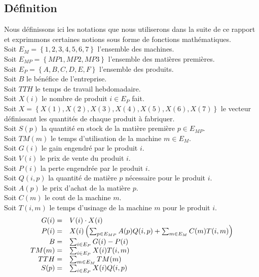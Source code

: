 \documentclass[a4paper, 11pt]{article}
\begin{document}
\subsection{Définition}
Nous définissons ici les notations que nous utiliserons dans la suite de ce
rapport et exprimmons certaines notions sous forme de fonctions mathématiques.
\\
Soit $E_M = \left\{1, 2, 3, 4, 5, 6, 7\right\} $ l'ensemble des machines. \\
Soit $E_{MP} = \left\{MP1, MP2, MP3\right\} $ l'ensemble des matières premières. \\
Soit $E_P = \left\{A, B, C, D, E, F\right\} $ l'ensemble des produits. \\
Soit $B$ le bénéfice de l'entreprise. \\
Soit $TTH$ le temps de travail hebdomadaire. \\
Soit $X(i)$ le nombre de produit $i\in E_P$ fait. \\
Soit $X = \left\{X(1), X(2), X(3), X(4), X(5), X(6), X(7)\right\}$ le vecteur
définissant les quantités de chaque produit à fabriquer.\\
Soit $S(p)$ la quantité en stock de la matière première $p\in E_{MP}$. \\
Soit $TM(m)$ le temps d'utilisation de la machine $m\in E_M$.\\
Soit $G(i)$ le gain engendré par le produit $i$. \\
Soit $V(i)$ le prix de vente du produit $i$. \\
Soit $P(i)$ la perte engendrée par le produit $i$. \\
Soit $Q(i, p)$ la quantité de matière $p$ nécessaire pour le produit $i$. \\
Soit $A(p)$ le prix d'achat de la matière $p$. \\
Soit $C(m)$ le cout de la machine $m$. \\
Soit $T(i, m)$ le temps d'usinage de la machine $m$ pour le produit $i$. \\

$$
\begin{array}{r l}
    G(i) =  & V(i)\cdot X(i) \\
    P(i) =  & X(i)\left(\sum_{p\in E_{MP}} A(p)Q(i, p)+ \sum_{m\in E_M} C(m)T(i, m)\right) \\
    B =     & \sum_{i\in E_P} G(i) - P(i) \\
    TM(m) = & \sum_{i\in E_P} X(i)T(i, m) \\
    TTH =   & \sum_{m\in E_M} TM(m) \\
    S(p) =  & \sum_{i\in E_P} X(i)Q(i, p) \\
\end{array}
$$
\end{document}
